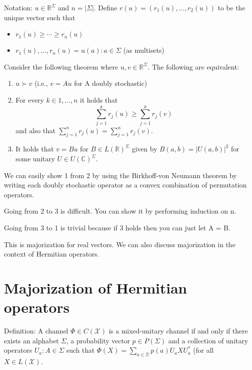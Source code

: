 \documentclass{article}
\begin{document}
    Notation: $u \in \mathbb{R}^\Sigma$ and $n = |\Sigma|$. Define $r(u) =
    (r_1(u),\ldots, r_2(u))$ to be the unique vector such that
    
    \begin{itemize}
        \item $r_1(u) \ge \cdots \ge r_n(u)$
        \item ${r_1(u),\ldots,r_n(u)} = {u(a): a \in \Sigma}$ (as
            multisets)
    \end{itemize}

    Consider the following theorem where $u,v \in \mathbb{R}^\Sigma$. The
    following are equivalent:
    \begin{enumerate}
        \item $ u \succ v $ (i.e., $v = Au$ for A doubly stochastic)
        \item For every $k \in {1,\ldots,n}$ it holds that
            $$\sum\limits_{j=1}^{k} r_j(u) \ge \sum\limits_{j=1}^k r_j(v)$$
            and also that $\sum\limits_{j=1}^n r_j(u) =
            \sum\limits_{j=1}^nr_j(v)$.
        \item It holds that $v= Bu$ for $B \in L(\mathbb{R})^\Sigma$ given by
                $B(a,b) = |U(a,b)|^2$ for some unitary $U \in U(\mathbb{C})^\Sigma$.
    \end{enumerate}

    We can easily show 1 from 2 by using the Birkhoff-von Neumann theorem by
    writing each doubly stochastic operator as a convex combination of
    permutation operators.

    Going from 2 to 3 is difficult. You can show it by performing induction on
    n.

    Going from 3 to 1 is trivial because if 3 holds then you can just let A =
    B.

    This is majorization for real vectors. We can also discuss majorization in
    the context of Hermitian operators.
    \section{Majorization of Hermitian operators}

    Definition: A channel $\Phi \in C(\mathcal{X})$ is a mixed-unitary channel
    if and only if there exists an alphabet $\Sigma$, a probability vector $p
    \in P(\Sigma)$ and a collection of unitary operators ${U_a : A \in  \Sigma}$
    such that $\Phi(X) = \sum\limits_{a\in\Sigma} p(a) U_a X U_a ^*$ (for all 
    $X \in L(\mathcal{X})$.
\end{document}
